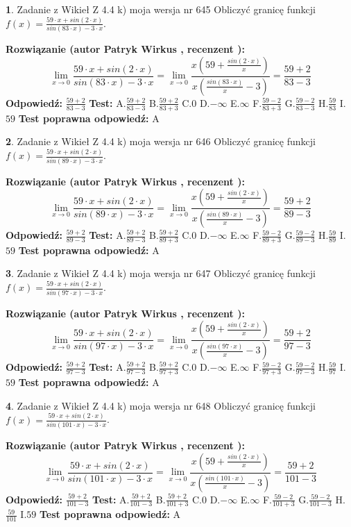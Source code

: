 \documentclass[12pt, a4paper]{article}
\theoremstyle{definition} %
\newtheorem{zad}{}
\newcommand{\zadStart}[1]{\begin{zad}#1\newline}
\newcommand{\zadStop}{\end{zad}}
\newcommand{\rozwStart}[2]{\noindent \textbf{Rozwiązanie (autor #1 , recenzent #2): }\newline}
\newcommand{\rozwStop}{\newline}
\newcommand{\odpStart}{\noindent \textbf{Odpowiedź:}\newline}
\newcommand{\odpStop}{\newline}
\newcommand{\testStart}{\noindent \textbf{Test:}\newline}
\newcommand{\testStop}{\newline}
\newcommand{\kluczStart}{\noindent \textbf{Test poprawna odpowiedź:}\newline}
\newcommand{\kluczStop}{\newline}
\begin{document}
\zadStart{Zadanie z Wikieł Z 4.4 k) moja wersja nr 645}
Obliczyć granicę funkcji $f(x)=\frac{59\cdot x +sin(2\cdot x)}{sin(83\cdot x) -3\cdot x}$.
\zadStop
\rozwStart{Patryk Wirkus}{}
$$\lim\limits_{x\to 0}\frac{59\cdot x +sin(2\cdot x)}{sin(83\cdot x) -3\cdot x}
=\lim\limits_{x\to 0}\frac{x(59+\frac{sin(2\cdot x)}{x})}{x(\frac{sin(83\cdot x)}{x}-3)}
=\frac{59+2}{83-3}$$
\rozwStop
\odpStart
$\frac{59+2}{83-3}$
\odpStop
\testStart
A.$\frac{59+2}{83-3}$
B.$\frac{59+2}{83+3}$
C.$0$
D.$-\infty$
E.$\infty$
F.$\frac{59-2}{83+3}$
G.$\frac{59-2}{83-3}$
H.$\frac{59}{83}$
I.$59$
\testStop
\kluczStart
A
\kluczStop



\zadStart{Zadanie z Wikieł Z 4.4 k) moja wersja nr 646}
Obliczyć granicę funkcji $f(x)=\frac{59\cdot x +sin(2\cdot x)}{sin(89\cdot x) -3\cdot x}$.
\zadStop
\rozwStart{Patryk Wirkus}{}
$$\lim\limits_{x\to 0}\frac{59\cdot x +sin(2\cdot x)}{sin(89\cdot x) -3\cdot x}
=\lim\limits_{x\to 0}\frac{x(59+\frac{sin(2\cdot x)}{x})}{x(\frac{sin(89\cdot x)}{x}-3)}
=\frac{59+2}{89-3}$$
\rozwStop
\odpStart
$\frac{59+2}{89-3}$
\odpStop
\testStart
A.$\frac{59+2}{89-3}$
B.$\frac{59+2}{89+3}$
C.$0$
D.$-\infty$
E.$\infty$
F.$\frac{59-2}{89+3}$
G.$\frac{59-2}{89-3}$
H.$\frac{59}{89}$
I.$59$
\testStop
\kluczStart
A
\kluczStop



\zadStart{Zadanie z Wikieł Z 4.4 k) moja wersja nr 647}
Obliczyć granicę funkcji $f(x)=\frac{59\cdot x +sin(2\cdot x)}{sin(97\cdot x) -3\cdot x}$.
\zadStop
\rozwStart{Patryk Wirkus}{}
$$\lim\limits_{x\to 0}\frac{59\cdot x +sin(2\cdot x)}{sin(97\cdot x) -3\cdot x}
=\lim\limits_{x\to 0}\frac{x(59+\frac{sin(2\cdot x)}{x})}{x(\frac{sin(97\cdot x)}{x}-3)}
=\frac{59+2}{97-3}$$
\rozwStop
\odpStart
$\frac{59+2}{97-3}$
\odpStop
\testStart
A.$\frac{59+2}{97-3}$
B.$\frac{59+2}{97+3}$
C.$0$
D.$-\infty$
E.$\infty$
F.$\frac{59-2}{97+3}$
G.$\frac{59-2}{97-3}$
H.$\frac{59}{97}$
I.$59$
\testStop
\kluczStart
A
\kluczStop



\zadStart{Zadanie z Wikieł Z 4.4 k) moja wersja nr 648}
Obliczyć granicę funkcji $f(x)=\frac{59\cdot x +sin(2\cdot x)}{sin(101\cdot x) -3\cdot x}$.
\zadStop
\rozwStart{Patryk Wirkus}{}
$$\lim\limits_{x\to 0}\frac{59\cdot x +sin(2\cdot x)}{sin(101\cdot x) -3\cdot x}
=\lim\limits_{x\to 0}\frac{x(59+\frac{sin(2\cdot x)}{x})}{x(\frac{sin(101\cdot x)}{x}-3)}
=\frac{59+2}{101-3}$$
\rozwStop
\odpStart
$\frac{59+2}{101-3}$
\odpStop
\testStart
A.$\frac{59+2}{101-3}$
B.$\frac{59+2}{101+3}$
C.$0$
D.$-\infty$
E.$\infty$
F.$\frac{59-2}{101+3}$
G.$\frac{59-2}{101-3}$
H.$\frac{59}{101}$
I.$59$
\testStop
\kluczStart
A
\kluczStop
\end{document}
